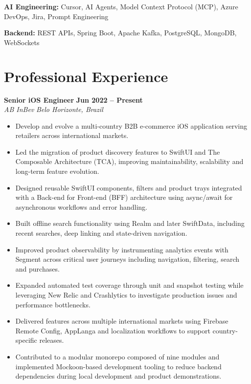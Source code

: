 \documentclass[10pt,a4paper]{article}
\newcommand{\job}[4]{%
\textbf{#1} \hfill \textbf{#2}\\
\textit{#3} \hfill \textit{#4}\\[-2pt]
}
\begin{document}
\textbf{AI Engineering:}
Cursor, AI Agents, Model Context Protocol (MCP), Azure DevOps, Jira, Prompt Engineering

\textbf{Backend:}
REST APIs, Spring Boot, Apache Kafka, PostgreSQL, MongoDB, WebSockets


\section{Professional Experience}

\job{Senior iOS Engineer}{Jun 2022 -- Present}{AB InBev}{Belo Horizonte, Brazil}

\begin{itemize}

\item Develop and evolve a multi-country B2B e-commerce iOS application serving retailers across international markets.

\item Led the migration of product discovery features to SwiftUI and The Composable Architecture (TCA), improving maintainability, scalability and long-term feature evolution.

\item Designed reusable SwiftUI components, filters and product trays integrated with a Back-end for Front-end (BFF) architecture using async/await for asynchronous workflows and error handling.

\item Built offline search functionality using Realm and later SwiftData, including recent searches, deep linking and state-driven navigation.

\item Improved product observability by instrumenting analytics events with Segment across critical user journeys including navigation, filtering, search and purchases.

\item Expanded automated test coverage through unit and snapshot testing while leveraging New Relic and Crashlytics to investigate production issues and performance bottlenecks.

\item Delivered features across multiple international markets using Firebase Remote Config, AppLanga and localization workflows to support country-specific releases.

\item Contributed to a modular monorepo composed of nine modules and implemented Mockoon-based development tooling to reduce backend dependencies during local development and product demonstrations.


\end{itemize}
\end{document}

